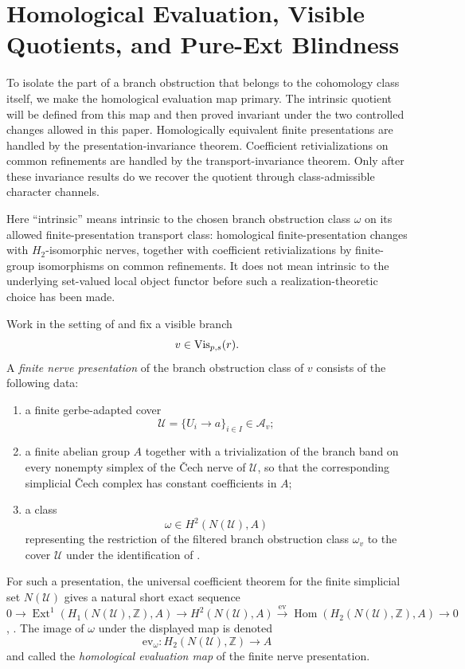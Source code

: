 ﻿\section{Homological Evaluation, Visible Quotients, and Pure-Ext Blindness}\label{sec:homological-visibility}

To isolate the part of a branch obstruction that belongs to the cohomology class itself, we make the homological evaluation map primary. The intrinsic quotient will be defined from this map and then proved invariant under the two controlled changes allowed in this paper. Homologically equivalent finite presentations are handled by the presentation-invariance theorem. Coefficient retivializations on common refinements are handled by the transport-invariance theorem. Only after these invariance results do we recover the quotient through class-admissible character channels.

Here ``intrinsic'' means intrinsic to the chosen branch obstruction class $\omega$ on its allowed finite-presentation transport class: homological finite-presentation changes with $H_2$-isomorphic nerves, together with coefficient retivializations by finite-group isomorphisms on common refinements. It does not mean intrinsic to the underlying set-valued local object functor before such a realization-theoretic choice has been made.

\begin{definition}\label{def:finite-nerve-presentation}
Work in the setting of  and fix a visible
branch
\[
v\in \mathrm{Vis}_{p,s}(r).
\]
A \emph{finite nerve presentation} of the branch obstruction class of $v$
consists of the following data:
\begin{enumerate}[label=(\roman*),nosep]
\item a finite gerbe-adapted cover
\[
\mathcal U=\{U_i\to a\}_{i\in I}\in \mathcal A_v;
\]
\item a finite abelian group $A$ together with a trivialization of the branch
band on every nonempty simplex of the \v{C}ech nerve of $\mathcal U$, so that
the corresponding simplicial \v{C}ech complex has constant coefficients in $A$;
\item a class
\[
\omega\in H^2(N(\mathcal U),A)
\]
representing the restriction of the filtered branch obstruction class
$\omega_v$ to the cover $\mathcal U$ under the identification of
.
\end{enumerate}
For such a presentation, the universal coefficient theorem for the finite
simplicial set $N(\mathcal U)$ gives a natural short exact sequence
\[
0\longrightarrow
\operatorname{Ext}^1(H_1(N(\mathcal U),\mathbb Z),A)
\longrightarrow
H^2(N(\mathcal U),A)
\xrightarrow{\ \mathrm{ev}\ }
\operatorname{Hom}(H_2(N(\mathcal U),\mathbb Z),A)
\longrightarrow 0
\]
\cite[Sec.~3A]{Hatcher2002}, \cite[Sec.~3.5]{Weibel1994}.
The image of $\omega$ under the displayed map is denoted
\[
\mathrm{ev}_{\omega}:H_2(N(\mathcal U),\mathbb Z)\to A
\]
and called the \emph{homological evaluation map} of the finite nerve
presentation.
\end{definition}

